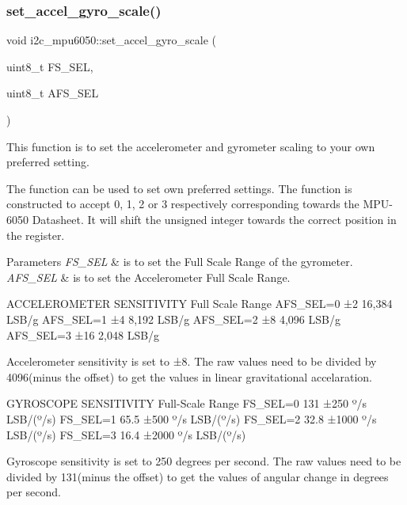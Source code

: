 \subsubsection{\texorpdfstring{set\+\_\+accel\+\_\+gyro\+\_\+scale()}{set\_accel\_gyro\_scale()}}
{\footnotesize\ttfamily void i2c\+\_\+mpu6050\+::set\+\_\+accel\+\_\+gyro\+\_\+scale (\begin{DoxyParamCaption}\item[{uint8\+\_\+t}]{F\+S\+\_\+\+S\+EL,  }\item[{uint8\+\_\+t}]{A\+F\+S\+\_\+\+S\+EL }\end{DoxyParamCaption})}



This function is to set the accelerometer and gyrometer scaling to your own preferred setting. 

The function can be used to set own preferred settings. The function is constructed to accept 0, 1, 2 or 3 respectively corresponding towards the M\+P\+U-\/6050 Datasheet. It will shift the unsigned integer towards the correct position in the register. 
\begin{DoxyParams}{Parameters}
{\em F\+S\+\_\+\+S\+EL} & is to set the Full Scale Range of the gyrometer. \\
\hline
{\em A\+F\+S\+\_\+\+S\+EL} & is to set the Accelerometer Full Scale Range. 
\begin{DoxyCode}
ACCELEROMETER SENSITIVITY Full Scale Range
AFS\_SEL=0   ±2  16,384  LSB/g
AFS\_SEL=1   ±4  8,192   LSB/g   
AFS\_SEL=2   ±8  4,096   LSB/g
AFS\_SEL=3   ±16 2,048   LSB/g

Accelerometer sensitivity is \textcolor{keyword}{set} to ±8. The raw values need to be divided by 4096(minus the offset) to \textcolor{keyword}{get} 
      the values in linear gravitational accelaration.


GYROSCOPE   SENSITIVITY     Full-Scale Range    
FS\_SEL=0        131             ±250 º/s    LSB/(º/s)
FS\_SEL=1        65.5            ±500 º/s    LSB/(º/s)
FS\_SEL=2        32.8            ±1000 º/s   LSB/(º/s)
FS\_SEL=3        16.4            ±2000 º/s   LSB/(º/s)

Gyroscope sensitivity is \textcolor{keyword}{set} to 250 degrees per second. The raw values need to be divided by 131(minus the 
      offset) to \textcolor{keyword}{get} the values of angular change in degrees per second.
\end{DoxyCode}
 \\
\hline
\end{DoxyParams}
\mbox{\label{classi2c__mpu6050_a232b262d69cb592aa65a1ed334104cc1}} 
